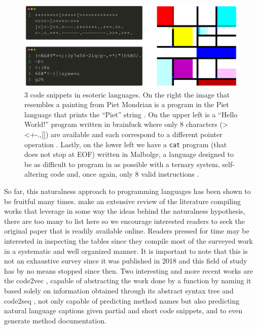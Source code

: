 \begin{figure}[!ht]
\centerline{\includegraphics[width=\textwidth]{figuras/eso.png}   }
\caption{3 code snippets in esoteric languages. On the right the image that resembles a painting from Piet Mondrian is a program in the Piet language that prints the ``Piet'' string \citep{piet_image}. On the upper left is a ``Hello World!'' program written in brainfuck where only 8 characters (><+-.,[]) are available and each correspond to a different pointer operation \citep{brainfuck_codigo}. Lastly, on the lower left we have a \texttt{cat} program (that does not stop at EOF) written in Malbolge, a language designed to be as difficult to program in as possible with a ternary system, self-altering code and, once again, only 8 valid instructions \citep{malbolge_codigo}.}
\label{fig:eso}
\end{figure}



So far, this naturalness approach to programming languages has been shown to be fruitful many times. \citet{allamanis2018survey} make an extensive review of the literature compiling works that leverage in some way the ideas behind the naturalness hypothesis, there are too many to list here so we encourage interested readers to seek the original paper that is readily available online. Readers pressed for time may be interested in inspecting the tables since they compile most of the surveyed work in a systematic and well organized manner. It is important to note that this is not an exhaustive survey since it was published in 2018 and this field of study has by no means stopped since then. Two interesting and more recent works are the code2vec \citep{code2vec}, capable of abstracting the work done by a function by naming it based solely on information obtained through its abstract syntax tree and code2seq \citep{code2seq}, not only capable of predicting method names but also predicting natural language captions given partial and short code snippets, and to even generate method documentation.

